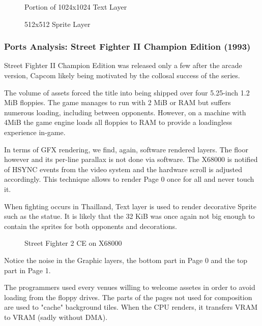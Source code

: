 \begin{minipage}[t]{0.49\linewidth}
  \begin{figure}[H]
  \caption*{Portion of 1024x1024 Text Layer}
  \end{figure}
\end{minipage}%
\hfill
\begin{minipage}[t]{0.49\linewidth}
   \begin{figure}[H]
  \caption*{512x512 Sprite Layer}
  \end{figure}
\end{minipage}%


\pagebreak
\subsubsection{Ports Analysis: Street Fighter II Champion Edition (1993)}
Street Fighter II Champion Edition was released only a few after the arcade version, Capcom likely being motivated by the collosal success of the series.

The volume of assets forced the title into being shipped over four 5.25-inch 1.2 MiB floppies. The game manages to run with 2 MiB or RAM but suffers numerous loading, including between opponents. However, on a machine with 4MiB the game engine loads all floppies to RAM to provide a loadingless experience in-game.

In terms of GFX rendering, we find, again, software rendered layers. The floor however and its per-line parallax is not done via software. The X68000 is notified of HSYNC events from the video system and the hardware scroll is adjusted accordingly. This technique allows to render Page 0 once for all and never touch it.

When fighting occurs in Thailland, Text layer is used to render decorative Sprite such as the statue. It is likely that the 32 KiB was once again not big enough to contain the sprites for both opponents and decorations.

\begin{figure}[H]
\caption*{Street Fighter 2 CE on X68000}
\end{figure}


\pagebreak

Notice the noise in the Graphic layers, the bottom part in Page 0 and the top part in Page 1. 

The programmers used every venues willing to welcome assetes in order to avoid loading from the floppy drives. The parts of the pages not used for composition are used to "cache" background tiles. When the CPU renders, it transfers VRAM to VRAM (sadly without DMA).

